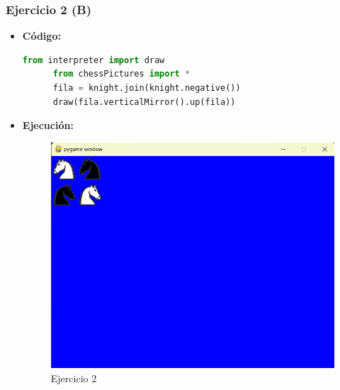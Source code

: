 \documentclass{article}
\begin{document}
  \subsubsection{Ejercicio 2 (B)}
  \begin{itemize}
    \item \textbf{Código:}
    \begin{lstlisting}[language=Python, caption=Ejercicio2b]
      from interpreter import draw
      from chessPictures import *
      fila = knight.join(knight.negative())
      draw(fila.verticalMirror().up(fila))
    \end{lstlisting}
    \item \textbf{Ejecución:}  
    \begin{figure}[H]
      \centering
      \includegraphics[width=1\textwidth, keepaspectratio]{img/ejercicio2b.png}
      \caption{Ejercicio 2}
    \end{figure}
  \end{itemize}
  \newpage

\end{document}
